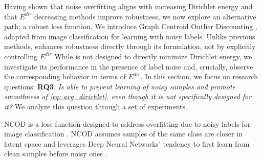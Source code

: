 Having shown that noise overfitting aligns with increasing  Dirichlet energy and that $E^{dir}$ decreasing methods improve robustness, we now explore an alternative path; a robust loss function. We introduce Graph Centroid Outlier Discounting \method, adapted from \citet{wani2023combining} image classification for learning with noisy labels. Unlike previous methods, \method enhances robustness directly through its formulation, not by explicitly controlling $E^{dir}$
While \method is not designed to directly minimize Dirichlet energy, we investigate its performance in the presence of label noise and, crucially, observe the corresponding behavior in terms of $E^{dir}$.  In this section, we focus on research questions: \textbf{RQ3}.\textit{ Is \method able to prevent learning of noisy samples and promote smoothness of \eqref{eq: avg_dirichlet}, even though it is not specifically designed for it?}
We analyze this question through a set of experiments.

 NCOD \citet{wani2023combining} is a loss function designed to address overfitting due to noisy labels for image classification \citep{memorizenoise}. 
NCOD assumes samples of the same class are closer in latent space and leverages Deep Neural Networks' tendency to first learn from clean samples before noisy ones \citep{arpit2017closer}. 


 


